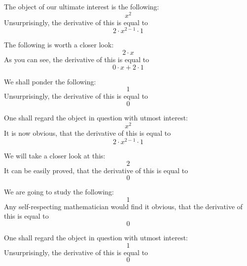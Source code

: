 \documentclass{article}
\begin{document}
The object of our ultimate interest is the following:
\begin{equation}
x ^{2 } 
\end{equation}
Unsurprisingly, the derivative of this is equal to
\begin{equation}
2 \cdot x ^{2 - 1 } \cdot 1 
\end{equation}

The following is worth a closer look:
\begin{equation}
2 \cdot x 
\end{equation}
As you can see, the derivative of this is equal to
\begin{equation}
0 \cdot x + 2 \cdot 1 
\end{equation}

We shall ponder the following:
\begin{equation}
1 
\end{equation}
Unsurprisingly, the derivative of this is equal to
\begin{equation}
0 
\end{equation}

One shall regard the object in question with utmost interest:
\begin{equation}
x ^{2 } 
\end{equation}
It is now obvious, that the derivative of this is equal to
\begin{equation}
2 \cdot x ^{2 - 1 } \cdot 1 
\end{equation}

We will take a closer look at this:
\begin{equation}
2 
\end{equation}
It can be easily proved, that the derivative of this is equal to
\begin{equation}
0 
\end{equation}

We are going to study the following:
\begin{equation}
1 
\end{equation}
Any self-respecting mathematician would find it obvious, that the derivative of this is equal to
\begin{equation}
0 
\end{equation}

One shall regard the object in question with utmost interest:
\begin{equation}
1 
\end{equation}
Unsurprisingly, the derivative of this is equal to
\begin{equation}
0 
\end{equation}
\end{document}
